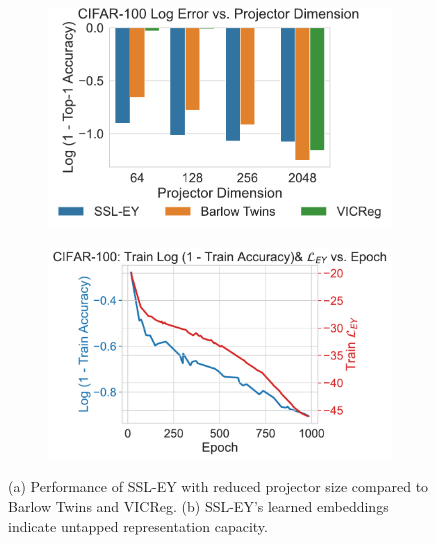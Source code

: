 \begin{figure}[H]
    \begin{subfigure}[b]{0.47\textwidth}
        \centering
        \includegraphics[width=\textwidth]{figures/SSL/cifar100_proj_dim_log_error}
        \caption{}
        \label{fig: ssl projector dimensions 100}
    \end{subfigure}
    \begin{subfigure}[b]{0.47\textwidth}
        \centering
        \includegraphics[width=\textwidth]{figures/SSL/cifar100_corr_vs_acc_log_error}
        \caption{}
        \label{fig:ssl learning curve cifar100 vs corr}
    \end{subfigure}
    \caption{(a) Performance of SSL-EY with reduced projector size compared to Barlow Twins and VICReg. (b) SSL-EY's learned embeddings indicate untapped representation capacity.}
    \label{fig: ssl projector cifar 100}
\end{figure}
